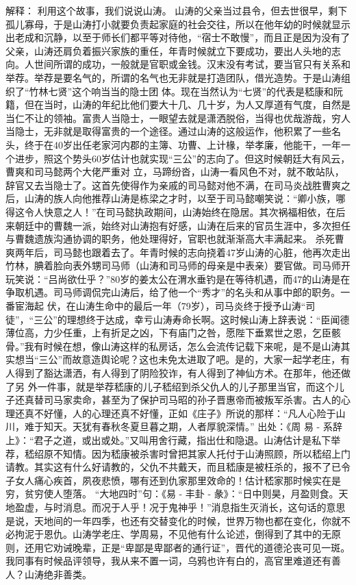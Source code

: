 \documentclass[]{book}
\begin{document}
解释： 利用这个故事，我们说说山涛。
山涛的父亲当过县令，但去世很早，剩下孤儿寡母，于是山涛打小就要负责起家庭的社会交往，所以在他年幼的时候就显示出老成和沉静，以至于师长们都平等对待他，``宿士不敢慢''，而且正是因为没有了父亲，山涛还肩负着振兴家族的重任，年青时候就立下要成功，要出人头地的志向。人世间所谓的成功，一般就是官职或金钱。汉末没有考试，要当官只有关系和举荐。举荐是要名气的，所谓的名气也无非就是打造团队，借光造势。于是山涛组织了``竹林七贤''这个响当当的隐士团
体。现在当然认为``七贤''的代表是嵇康和阮籍，但在当时，山涛的年纪比他们要大十几、几十岁，为人又厚道有气度，自然是当仁不让的领袖。富贵人当隐士，一眼望去就是潇洒脱俗，当得也优哉游哉，穷人当隐士，无非就是取得富贵的一个途径。通过山涛的这般运作，他积累了一些名头，终于在40岁出任老家河内郡的主簿、功曹、上计椽，举孝廉，他能干，一年一个进步，照这个势头60岁估计也就实现``三公''的志向了。但这时候朝廷大有风云，曹爽和司马懿两个大佬严重对
立，马蹄纷沓，山涛一看风色不对，就不敢站队，辞官又去当隐士了。这首先使得作为亲戚的司马懿对他不满，在司马炎战胜曹爽之后，山涛的族人向他推荐山涛是栋梁之才时，以至于司马懿嘲笑说：``卿小族，哪得这令人快意之人！''在司马懿执政期间，山涛始终在隐居。其次祸福相依，在后来朝廷中的曹魏一派，始终对山涛抱有好感，山涛在后来的官员生涯中，多次担任与曹魏遗族沟通协调的职务，他处理得好，官职也就渐渐高大丰满起来。
杀死曹爽两年后，司马懿也跟着去了。年青时候的志向挠着47岁山涛的心脏，他再次走出竹林，腆着脸向表外甥司马师（山涛和司马师的母亲是中表亲）要官做。司马师开玩笑说：``吕尚欲仕乎？''80岁的姜太公在渭水垂钓是在等待机遇，而47的山涛是在争取机遇。司马师调侃完山涛后，给了他一个``秀才''的名头和从事中郎的职务。一番宦海起
伏，在山涛生命中的最后一年（79岁），司马炎终于授予山涛``司徒''，``三公''的理想终于达成，幸亏山涛寿命长啊。这时候山涛上辞表说：``臣闻德薄位高，力少任重，上有折足之凶，下有庙门之咎，愿陛下垂累世之恩，乞臣骸骨。''我有时候在想，像山涛这样的私房话，怎么会流传记载下来呢，是不是山涛其实想当``三公''而故意造舆论呢？这也未免太进取了吧。是的，大家一起学老庄，有人得到了豁达潇洒，有人得到了阴险狡诈，有人得到了神仙方术。在那年，他还做了另
外一件事，就是举荐嵇康的儿子嵇绍到杀父仇人的儿子那里当官，而这个儿子还真替司马家卖命，甚至为了保护司马昭的孙子晋惠帝而被叛军杀害。古人的心理还真不好懂，人的心理还真不好懂，正如《庄子》所说的那样：``凡人心险于山川，难于知天。天犹有春秋冬夏旦暮之期，人者厚貌深情。''
出处：《周 易 -
系辞上》：``君子之道，或出或处。''又叫用舍行藏，指出仕和隐退。山涛估计是私下举荐，嵇绍原不知情。因为嵇康被杀害时曾把其家人托付于山涛照顾，所以嵇绍上门请教。其实这有什么好请教的，父仇不共戴天，而且嵇康是被枉杀的，报不了已令子女人痛心疾首，夙夜悲愤，哪有还到仇家那里效命的！估计嵇家那时候实在是穷，贫穷使人堕落。
``大地四时''句：《易 - 丰卦 -
彖》：``日中则昊，月盈则食。天地盈虚，与时消息。而况于人乎！况于鬼神乎！''消息指生灭消长，这句话的意思是说，天地间的一年四季，也还有交替变化的时候，世界万物也都在变化，你就不必拘泥于恩仇。山涛学老庄、学周易，不见他有什么论述，倒得到了其中的无原则，还用它劝诫晚辈，正是``卑鄙是卑鄙者的通行证''，晋代的道德沦丧可见一斑。我同事有时候品评领导，我从来不置一词，乌鸦也许有白的，高官里难道还有善人？山涛绝非善类。
\end{document}
